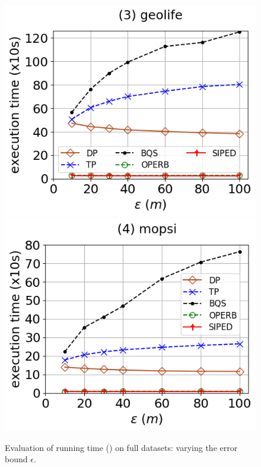 \begin{figure}[tb!]
	\includegraphics[scale=0.315]{Figures/Exp-PED-time-epsilon-geolife.png}	\hspace{1ex}
	\includegraphics[scale=0.315]{Figures/Exp-PED-time-epsilon-mopsi.png}	\hspace{1ex}
	\vspace{-3ex}
	\caption{\small Evaluation of running time (\ped) on full datasets: varying the error bound $\epsilon$.}\label{fig:time-epsilon-ped}
	\vspace{-2ex}
\end{figure}

